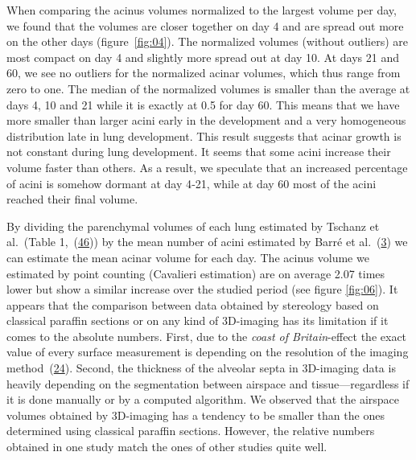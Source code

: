 \documentclass[
  american,
]{article}
\begin{document}
When comparing the acinus volumes normalized to the largest volume per day, we found that the volumes are closer together on day 4 and are spread out more on the other days (figure~\ref{fig:04}).
The normalized volumes (without outliers) are most compact on day 4 and slightly more spread out at day 10.
At days 21 and 60, we see no outliers for the normalized acinar volumes, which thus range from zero to one.
The median of the normalized volumes is smaller than the average at days 4, 10 and 21 while it is exactly at 0.5 for day 60.
This means that we have more smaller than larger acini early in the development and a very homogeneous distribution late in lung development.
This result suggests that acinar growth is not constant during lung development.
It seems that some acini increase their volume faster than others.
As a result, we speculate that an increased percentage of acini is somehow dormant at day 4‐21, while at day 60 most of the acini reached their final volume.

By dividing the parenchymal volumes of each lung estimated by Tschanz et al.~(Table 1,~(\protect\hyperlink{ref-wnl86DEM}{46})) by the mean number of acini estimated by Barré et al.~(\protect\hyperlink{ref-uFNlWogb}{3}) we can estimate the mean acinar volume for each day.
The acinus volume we estimated by point counting (Cavalieri estimation) are on average 2.07 times lower but show a similar increase over the studied period (see figure \ref{fig:06}).
It appears that the comparison between data obtained by stereology based on classical paraffin sections or on any kind of 3D-imaging has its limitation if it comes to the absolute numbers.
First, due to the \emph{coast of Britain}-effect the exact value of every surface measurement is depending on the resolution of the imaging method~(\protect\hyperlink{ref-AdXhaEV4}{24}).
Second, the thickness of the alveolar septa in 3D-imaging data is heavily depending on the segmentation between airspace and tissue---regardless if it is done manually or by a computed algorithm.
We observed that the airspace volumes obtained by 3D-imaging has a tendency to be smaller than the ones determined using classical paraffin sections.
However, the relative numbers obtained in one study match the ones of other studies quite well.
\end{document}
